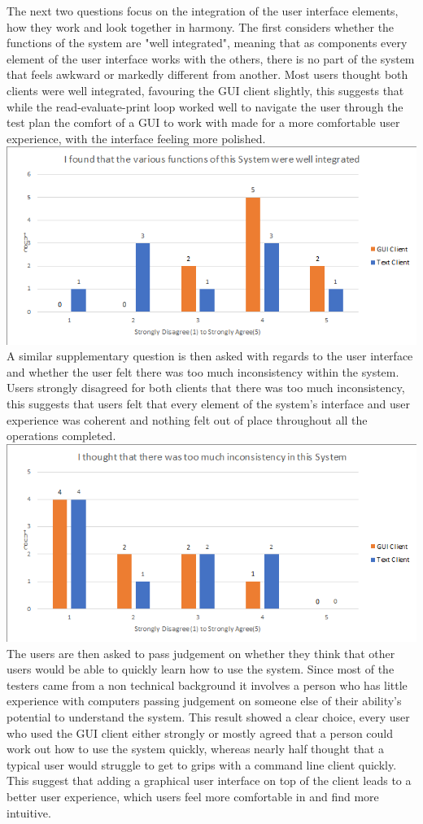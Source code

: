 \documentclass{article}
\begin{document}
The next two questions focus on the integration of the user interface elements, how they work and look together in harmony. The first considers whether the functions of the system are "well integrated", meaning that as components every element of the user interface works with the others, there is no part of the system that feels awkward or markedly different from another. Most users thought both clients were well integrated, favouring the GUI client slightly, this suggests that while the read-evaluate-print loop worked well to navigate the user through the test plan the comfort of a GUI to work with made for a more comfortable user experience, with the interface feeling more polished.
\\
\includegraphics[width=\textwidth]{graph5.PNG}
A similar supplementary question is then asked with regards to the user interface and whether the user felt there was too much inconsistency within the system. Users strongly disagreed for both clients that there was too much inconsistency, this suggests that users felt that every element of the system's interface and user experience was coherent and nothing felt out of place throughout all the operations completed.
\\
\includegraphics[width=\textwidth]{graph6.PNG}
The users are then asked to pass judgement on whether they think that other users would be able to quickly learn how to use the system. Since most of the testers came from a non technical background it involves a person who has little experience with computers passing judgement on someone else of their ability's potential to understand the system. This result showed a clear choice, every user who used the GUI client either strongly or mostly agreed that a person could work out how to use the system quickly, whereas nearly half thought that a typical user would struggle to get to grips with a command line client quickly. This suggest that adding a graphical user interface on top of the client leads to a better user experience, which users feel more comfortable in and find more intuitive.
\end{document}
